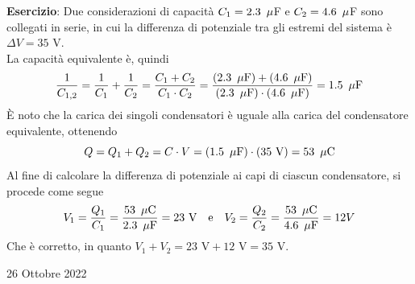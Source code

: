 \documentclass[a4paper]{extarticle}
\begin{document}
\vspace{1em}
\noindent
\textbf{Esercizio}: Due considerazioni di capacità $C_1=2.3 \hspace{0.5em} \mu$F e $C_2=4.6 \hspace{0.5em} \mu$F sono collegati in serie, in cui la differenza di potenziale tra gli estremi del sistema è $\Delta V = 35$ V.\\
La capacità equivalente è, quindi
\[\frac{1}{C_{1,2}} = \frac{1}{C_1} + \frac{1}{C_2} = \frac{C_1 + C_2}{C_1 \cdot C_2} = \frac{(2.3 \hspace{0.5em}\mu\text{F}) + (4.6 \hspace{0.5em}\mu\text{F})}{(2.3 \hspace{0.5em}\mu\text{F}) \cdot (4.6 \hspace{0.5em}\mu\text{F})} = 1.5\hspace{0.5em}\mu\text{F}\]
È noto che la carica dei singoli condensatori è uguale alla carica del condensatore equivalente, ottenendo
\[Q=Q_1+Q_2=C \cdot V = (1.5 \hspace{0.5em}\mu\text{F}) \cdot (35 \text{ V}) = 53 \hspace{0.5em}\mu\text{C}\]
Al fine di calcolare la differenza di potenziale ai capi di ciascun condensatore, si procede come segue
\[V_1 = \frac{Q_1}{C_1} = \frac{53 \hspace{0.5em}\mu\text{C}}{2.3 \hspace{0.5em}\mu\text{F}} = 23 \text{ V} \hspace{1em} \text{e} \hspace{1em} V_2 = \frac{Q_2}{C_2} = \frac{53 \hspace{0.5em}\mu\text{C}}{4.6 \hspace{0.5em}\mu\text{F}} = 12 V\]
Che è corretto, in quanto $V_1+V_2=23\text{ V}+12\text{ V}=35\text{ V}$.

\newpage
\noindent
\begin{center}
  26 Ottobre 2022
\end{center}
\end{document}
